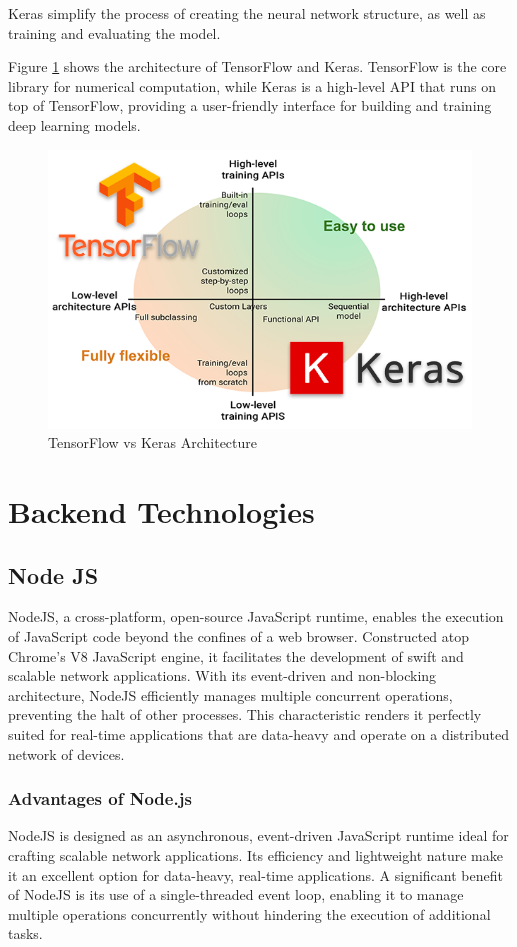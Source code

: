 Keras simplify the process of creating the neural network structure, as well as training and evaluating the model. 

Figure \ref{fig:keras} shows the architecture of TensorFlow and Keras. TensorFlow is the core library for numerical computation, while Keras is a high-level
API that runs on top of TensorFlow, providing a user-friendly interface for building and training deep learning models.

\begin{figure}[H]
    \centering
    \includegraphics[width=0.8\linewidth]{images/keras.png}
    \caption{TensorFlow vs Keras Architecture}
    \label{fig:keras}    
\end{figure}


\section{Backend Technologies}

\subsection{Node JS}
NodeJS, a cross-platform, open-source JavaScript runtime, enables the execution of JavaScript code beyond the confines of a web browser. Constructed atop Chrome's V8 JavaScript engine, it facilitates the development of swift and scalable network applications. With its event-driven and non-blocking architecture, NodeJS efficiently manages multiple concurrent operations, preventing the halt of other processes. This characteristic renders it perfectly suited for real-time applications that are data-heavy and operate on a distributed network of devices.\cite{nodejs}

\subsubsection*{Advantages of Node.js}
NodeJS is designed as an asynchronous, event-driven JavaScript runtime ideal for crafting scalable network applications. Its efficiency and lightweight nature make it an excellent option for data-heavy, real-time applications.\cite{tilkov}
A significant benefit of NodeJS is its use of a single-threaded event loop, enabling it to manage multiple operations concurrently without hindering the execution of additional tasks.

